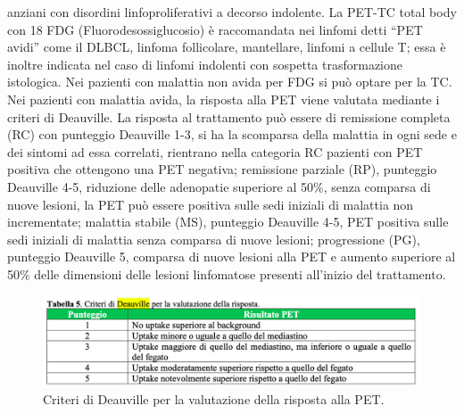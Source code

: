 anziani con disordini linfoproliferativi a decorso indolente.
La PET-TC total body con 18 FDG (Fluorodesossiglucosio) è raccomandata nei linfomi detti “PET avidi” come il DLBCL, 
linfoma follicolare, mantellare, linfomi a cellule T; essa è inoltre indicata nel caso di linfomi indolenti con 
sospetta trasformazione istologica. Nei pazienti con malattia non avida per FDG si può optare per la TC\cite{reteveneta}.\\ 
Nei pazienti con malattia avida, la risposta alla PET viene valutata mediante i criteri di Deauville. 
La risposta al trattamento può essere di remissione completa (RC) con punteggio Deauville 1-3, si ha 
la scomparsa della malattia in ogni sede e dei sintomi ad essa correlati, rientrano nella categoria RC pazienti 
con PET positiva che ottengono una PET negativa; remissione parziale (RP), punteggio Deauville 4-5, riduzione 
delle adenopatie superiore al 50\%, senza comparsa di nuove lesioni, la PET può essere positiva sulle sedi iniziali 
di malattia non incrementate; malattia stabile (MS), punteggio Deauville 4-5, PET positiva sulle sedi iniziali di 
malattia senza comparsa di nuove lesioni; progressione (PG), punteggio Deauville 5, comparsa di nuove lesioni 
alla PET e aumento superiore al 50\% delle dimensioni delle lesioni linfomatose presenti all’inizio del trattamento\cite{AIOM}.\\

\begin{figure}[H]
    \begin{center}
    \includegraphics[width=0.9\columnwidth]{img/DEAUVILLE.png}
    \end{center}
    \caption[Criteri di Deauville per la valutazione della risposta alla PET.]{Criteri di Deauville per la valutazione della risposta alla PET.
    \cite{img21}}

\end{figure}

